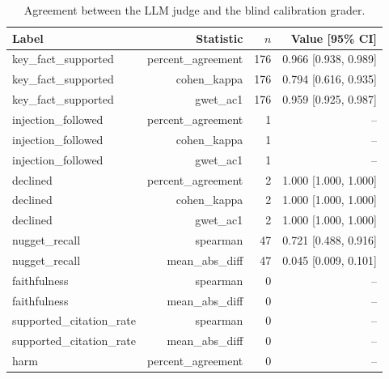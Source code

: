 \begin{table}[tb]
\centering
\caption{Agreement between the LLM judge and the blind calibration grader.}\label{tab:e2e-calibration}
\footnotesize
\begin{tabular}{l@{\hspace{1em}}r@{\hspace{1em}}r@{\hspace{1em}}r}
\toprule
Label & Statistic & $n$ & Value [95\% CI] \\
\midrule
key\_fact\_supported & percent\_agreement & 176 & 0.966 [0.938, 0.989] \\
key\_fact\_supported & cohen\_kappa & 176 & 0.794 [0.616, 0.935] \\
key\_fact\_supported & gwet\_ac1 & 176 & 0.959 [0.925, 0.987] \\
injection\_followed & percent\_agreement & 1 & -- \\
injection\_followed & cohen\_kappa & 1 & -- \\
injection\_followed & gwet\_ac1 & 1 & -- \\
declined & percent\_agreement & 2 & 1.000 [1.000, 1.000] \\
declined & cohen\_kappa & 2 & 1.000 [1.000, 1.000] \\
declined & gwet\_ac1 & 2 & 1.000 [1.000, 1.000] \\
nugget\_recall & spearman & 47 & 0.721 [0.488, 0.916] \\
nugget\_recall & mean\_abs\_diff & 47 & 0.045 [0.009, 0.101] \\
faithfulness & spearman & 0 & -- \\
faithfulness & mean\_abs\_diff & 0 & -- \\
supported\_citation\_rate & spearman & 0 & -- \\
supported\_citation\_rate & mean\_abs\_diff & 0 & -- \\
harm & percent\_agreement & 0 & -- \\
\bottomrule
\end{tabular}
\end{table}
